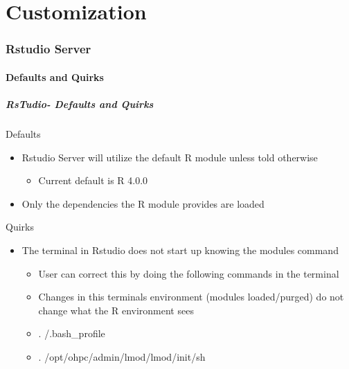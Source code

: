 \part{Customization}
\begin{frame}
			 \partpage
\end{frame}


\section[Rstudio]{Rstudio Server}
\subsection[rstudiodef]{Defaults and Quirks}
\begin{frame}
  \frametitle{RsTudio- Defaults and Quirks}
	\begin{block}{Defaults}
		\begin{itemize}
			\item Rstudio Server will utilize the default R module unless told otherwise
				\begin{itemize}
					\item Current default is R 4.0.0
				\end{itemize}
			\item Only the dependencies the R module provides are loaded
		\end{itemize}
	\end{block}
	\begin{block}{Quirks}
			\begin{itemize}
			\item The terminal in Rstudio does not start up knowing the modules command
			\begin{itemize}
			\item User can correct this by doing the following commands in the terminal
			\item Changes in this terminals environment (modules loaded/purged) do not change what the R environment sees
			\item . \ctilde{}/.bash\_profile
			\item . /opt/ohpc/admin/lmod/lmod/init/sh
			\end{itemize}
		\end{itemize}
	\end{block}
\end{frame}


